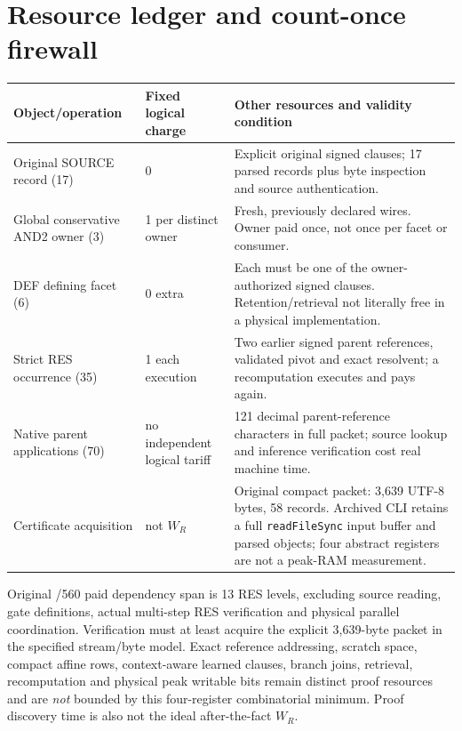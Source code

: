 \documentclass[11pt]{article}
\begin{document}
\section*{Resource ledger and count-once firewall}
\begin{center}
\begin{tabular}{@{}p{3.5cm}p{2cm}p{7.5cm}@{}}
\toprule
Object/operation & Fixed logical charge & Other resources and validity condition\\
\midrule
Original SOURCE record (17) & 0 & Explicit original signed clauses; 17 parsed records plus byte inspection and source authentication.\\
Global conservative AND2 owner (3) & 1 per distinct owner & Fresh, previously declared wires. Owner paid once, not once per facet or consumer.\\
DEF defining facet (6) & 0 extra & Each must be one of the owner-authorized signed clauses. Retention/retrieval not literally free in a physical implementation.\\
Strict RES occurrence (35) & 1 each execution & Two earlier signed parent references, validated pivot and exact resolvent; a recomputation executes and pays again.\\
Native parent applications (70) & no independent logical tariff & 121 decimal parent-reference characters in full packet; source lookup and inference verification cost real machine time.\\
Certificate acquisition & not \(W_R\) & Original compact packet: 3,639 UTF-8 bytes, 58 records. Archived CLI retains a full \texttt{readFileSync} input buffer and parsed objects; four abstract registers are not a peak-RAM measurement.\\
\bottomrule
\end{tabular}
\end{center}
Original /560 paid dependency span is 13 RES levels, excluding source reading, gate definitions, actual multi-step RES verification and physical parallel coordination. Verification must at least acquire the explicit 3,639-byte packet in the specified stream/byte model. Exact reference addressing, scratch space, compact affine rows, context-aware learned clauses, branch joins, retrieval, recomputation and physical peak writable bits remain distinct proof resources and are \emph{not} bounded by this four-register combinatorial minimum. Proof discovery time is also not the ideal after-the-fact \(W_R\).
\end{document}
